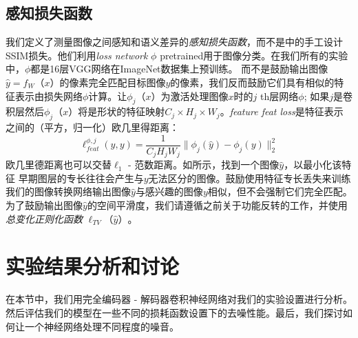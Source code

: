 \subsection{感知损失函数}

我们定义了测量图像之间感知和语义差异的\emph{感知损失函数}，而不是\cite{Zhao2015}中的手工设计SSIM损失。他们利用\emph{loss network} $ \phi $ pretrained用于图像分类。在我们所有的实验中，$ \phi $都是16层VGG网络\cite{Simonyan14c}在ImageNet数据集\cite{Deng2009ImageNet}上预训练。
而不是鼓励输出图像$ \hat y = f_W（x）$的像素完全匹配目标图像$ y $的像素，我们反而鼓励它们具有相似的特征表示由损失网络$ \phi $计算。让$ \phi_j（x）$为激活处理图像$ x $时的$ j $ th层网络$ \phi $; 如果$ j $是卷积层然后$ \phi_j（x）$将是形状的特征映射$ C_j \times H_j \times W_j $。\emph {feature feat loss}是特征表示之间的（平方，归一化）欧几里得距离： 
\begin{equation}
  \ell_{feat}^{\phi,j}(\hat y, y) = 
  \frac1{C_jH_jW_j}\|\phi_j(\hat y) - \phi_j(y)\|_2^2
\end{equation}
欧几里德距离也可以交替$ \ell_{1} $ - 范数距离。如\cite{Mahendran2015}所示，找到一个图像$ \hat y $，以最小化该特征
早期图层的专长往往会产生与$ y $无法区分的图像。鼓励使用特征专长丢失来训练我们的图像转换网络输出图像$ \hat y $与感兴趣的图像$ y $相似，但不会强制它们完全匹配。为了鼓励输出图像$ \hat y $的空间平滑度，我们请遵循之前关于功能反转\cite{Mahendran2015}的工作，并使用\emph {总变化正则化函数} $ \ell_{TV}（\hat y）$。
 
\section{实验结果分析和讨论}
\label{sec:experiments-results}

在本节中，我们用完全编码器 - 解码器卷积神经网络对我们的实验设置进行分析。然后评估我们的模型在一些不同的损耗函数设置下的去噪性能。最后，我们探讨如何让一个神经网络处理不同程度的噪音。
